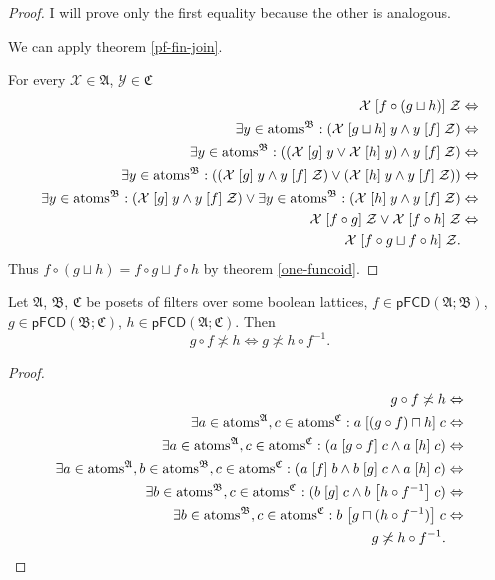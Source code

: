 \begin{proof}
I will prove only the first equality because the other is analogous.

We can apply theorem \ref{pf-fin-join}.

For every $\mathcal{X}\in\mathfrak{A}$, $\mathcal{Y}\in\mathfrak{C}$
\begin{align*}
\mathcal{X}\mathrel{\left[f\circ(g\sqcup h)\right]}\mathcal{Z} & \Leftrightarrow\\
\exists y\in\operatorname{atoms}^{\mathfrak{B}}:(\mathcal{X}\mathrel{\left[g\sqcup h\right]}y\land y\mathrel{\left[f\right]}\mathcal{Z}) & \Leftrightarrow\\
\exists y\in\operatorname{atoms}^{\mathfrak{B}}:((\mathcal{X}\mathrel{\left[g\right]}y\lor\mathcal{X}\mathrel{\left[h\right]}y)\land y\mathrel{\left[f\right]}\mathcal{Z}) & \Leftrightarrow\\
\exists y\in\operatorname{atoms}^{\mathfrak{B}}:((\mathcal{X}\mathrel{\left[g\right]}y\land y\mathrel{\left[f\right]}\mathcal{Z})\lor(\mathcal{X}\mathrel{\left[h\right]}y\land y\mathrel{\left[f\right]}\mathcal{Z})) & \Leftrightarrow\\
\exists y\in\operatorname{atoms}^{\mathfrak{B}}:(\mathcal{X}\mathrel{\left[g\right]}y\land y\mathrel{\left[f\right]}\mathcal{Z})\lor\exists y\in\operatorname{atoms}^{\mathfrak{B}}:(\mathcal{X}\mathrel{\left[h\right]}y\land y\mathrel{\left[f\right]}\mathcal{Z}) & \Leftrightarrow\\
\mathcal{X}\mathrel{\left[f\circ g\right]}\mathcal{Z}\lor\mathcal{X}\mathrel{\left[f\circ h\right]}\mathcal{Z} & \Leftrightarrow\\
\mathcal{X}\mathrel{\left[f\circ g\sqcup f\circ h\right]}\mathcal{Z}.
\end{align*}
Thus $f\circ(g\sqcup h)=f\circ g\sqcup f\circ h$ by theorem \ref{one-funcoid}.\end{proof}
\begin{thm}
\label{qi-bool}Let $\mathfrak{A}$, $\mathfrak{B}$, $\mathfrak{C}$
be posets of filters over some boolean lattices, $f\in\mathsf{pFCD}(\mathfrak{A};\mathfrak{B})$,
$g\in\mathsf{pFCD}(\mathfrak{B};\mathfrak{C})$, $h\in\mathsf{pFCD}(\mathfrak{A};\mathfrak{C})$.
Then 
\[
g\circ f\nasymp h\Leftrightarrow g\nasymp h\circ f^{-1}.
\]
\end{thm}
\begin{proof}
~
\begin{align*}
g\circ f\not\asymp h & \Leftrightarrow\\
\exists a\in\operatorname{atoms}^{\mathfrak{A}},c\in\operatorname{atoms}^{\mathfrak{C}}:a\mathrel{\left[(g\circ f)\sqcap h\right]}c & \Leftrightarrow\\
\exists a\in\operatorname{atoms}^{\mathfrak{A}},c\in\operatorname{atoms}^{\mathfrak{C}}:(a\mathrel{\left[g\circ f\right]}c\land a\mathrel{\left[h\right]}c) & \Leftrightarrow\\
\exists a\in\operatorname{atoms}^{\mathfrak{A}},b\in\operatorname{atoms}^{\mathfrak{B}},c\in\operatorname{atoms}^{\mathfrak{C}}:(a\mathrel{\left[f\right]}b\land b\mathrel{\left[g\right]}c\land a\mathrel{\left[h\right]}c) & \Leftrightarrow\\
\exists b\in\operatorname{atoms}^{\mathfrak{B}},c\in\operatorname{atoms}^{\mathfrak{C}}:(b\mathrel{\left[g\right]}c\land b\mathrel{\left[h\circ f^{-1}\right]}c) & \Leftrightarrow\\
\exists b\in\operatorname{atoms}^{\mathfrak{B}},c\in\operatorname{atoms}^{\mathfrak{C}}:b\mathrel{\left[g\sqcap(h\circ f^{-1})\right]}c & \Leftrightarrow\\
g\not\asymp h\circ f^{-1}.
\end{align*}

\end{proof}

